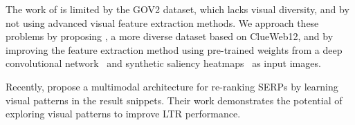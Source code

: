 The work of \citet{fan2017learning} is limited by the GOV2 dataset, which lacks visual diversity, and by not using advanced visual feature extraction methods.
We approach these problems by proposing \datasetname, a more diverse dataset based on ClueWeb12, and by improving the feature extraction method using
pre-trained weights from a deep convolutional network~\cite{simonyan2014very} and 
synthetic saliency heatmaps~\cite{shan2017two} as input images.

Recently, \citet{zhang2018relevance} propose a multimodal architecture for re-ranking \acp{SERP} by learning visual patterns in the result snippets. 
Their work demonstrates the potential of exploring visual patterns to improve \ac{LTR} performance. 





